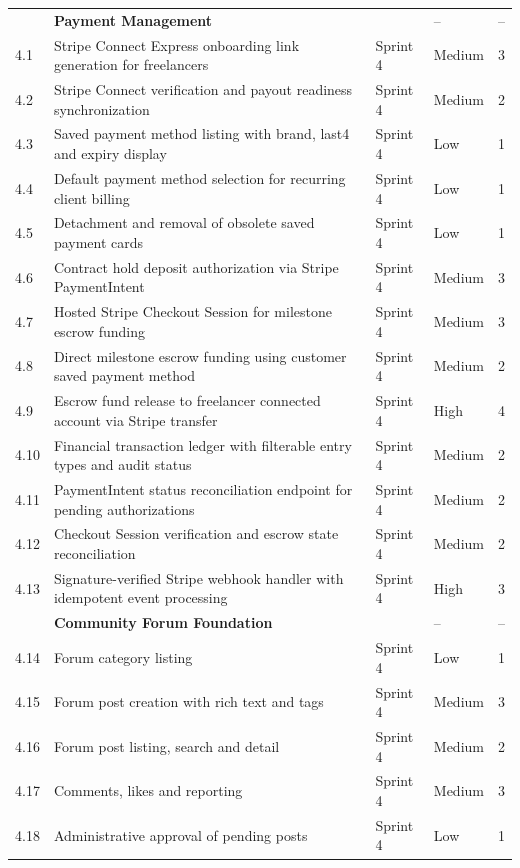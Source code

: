 \begin{longtable}{|
C{1.0cm}|
L{6.9cm}|
C{1.8cm}|
C{2.1cm}|
C{2.3cm}|}
 & \textbf{Payment Management} &  & -- & -- \\
4.1 & Stripe Connect Express onboarding link generation for freelancers & Sprint 4 & Medium & 3 \\
4.2 & Stripe Connect verification and payout readiness synchronization & Sprint 4 & Medium & 2 \\
4.3 & Saved payment method listing with brand, last4 and expiry display & Sprint 4 & Low & 1 \\
4.4 & Default payment method selection for recurring client billing & Sprint 4 & Low & 1 \\
4.5 & Detachment and removal of obsolete saved payment cards & Sprint 4 & Low & 1 \\
4.6 & Contract hold deposit authorization via Stripe PaymentIntent & Sprint 4 & Medium & 3 \\
4.7 & Hosted Stripe Checkout Session for milestone escrow funding & Sprint 4 & Medium & 3 \\
4.8 & Direct milestone escrow funding using customer saved payment method & Sprint 4 & Medium & 2 \\
4.9 & Escrow fund release to freelancer connected account via Stripe transfer & Sprint 4 & High & 4 \\
4.10 & Financial transaction ledger with filterable entry types and audit status & Sprint 4 & Medium & 2 \\
4.11 & PaymentIntent status reconciliation endpoint for pending authorizations & Sprint 4 & Medium & 2 \\
4.12 & Checkout Session verification and escrow state reconciliation & Sprint 4 & Medium & 2 \\
4.13 & Signature-verified Stripe webhook handler with idempotent event processing & Sprint 4 & High & 3 \\
\hline

 & \textbf{Community Forum Foundation} &  & -- & -- \\
4.14 & Forum category listing & Sprint 4 & Low & 1 \\
4.15 & Forum post creation with rich text and tags & Sprint 4 & Medium & 3 \\
4.16 & Forum post listing, search and detail & Sprint 4 & Medium & 2 \\
4.17 & Comments, likes and reporting & Sprint 4 & Medium & 3 \\
4.18 & Administrative approval of pending posts & Sprint 4 & Low & 1 \\
\hline


\end{longtable}
